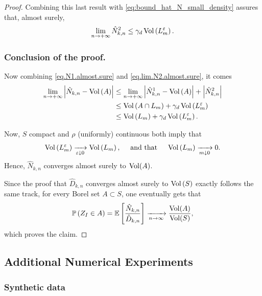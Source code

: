 \documentclass[twoside]{article}
\theoremstyle{definition}
\theoremstyle{remark}
\newcommand{\KVV}{Z} %
\begin{document}
\begin{proof}
Combining this last result with \cref{eq:bound_hat_N_small_density} assures that, almost surely,
\begin{align}\label{eq.lim.N2.almost.sure}
    \lim_{n\to+\infty} \hat{N}_{k,n}^2 \leq \gamma_d \operatorname{Vol}\left(L_m^\varepsilon\right) .
\end{align}   






\subsubsection*{Conclusion of the proof.}

Now combining \cref{eq.N1.almost.sure} and \cref{eq.lim.N2.almost.sure}, it comes
\begin{align*}
\lim_{n\to+\infty}\left|\hat{N}_{k,n} - \operatorname{Vol}\left(A\right)\right| & \leq \lim_{n\to+\infty}\left|\hat{N}_{k,n}^1 - \operatorname{Vol}\left(A\right)\right| + \left|\hat{N}_{k,n}^2\right| \\
&  \leq {\operatorname{Vol}\left(A\cap L_m\right)} + \gamma_d \operatorname{Vol}\left(L_m^\varepsilon\right) \\
& \leq \operatorname{Vol}\left(L_m\right) + \gamma_d \operatorname{Vol}\left(L_m^\varepsilon\right).
\end{align*}

Now, $S$ compact and $\rho$ (uniformly) continuous both imply that 
\[
    \operatorname{Vol}\left(L_m^\varepsilon\right) \xrightarrow[\varepsilon\downarrow 0]{} \operatorname{Vol}\left(L_m\right),\quad \text{ and that } \quad \operatorname{Vol}\left(L_m\right) \xrightarrow[m\downarrow 0]{} 0.
\]
%
Hence, $\hat{N}_{k,n}$ converges almost surely to $\operatorname{Vol}(A)$.

Since the proof that $\hat{D}_{k,n}$ converges almost surely to $\operatorname{Vol}\left(S\right)$ exactly follows the same track, for every Borel set $A\subset S$, one eventually gets that 
%
\[
    \P\pa{\KVV_I\in A} = \E\bra{\frac{\hat{N}_{k,n}}{\hat{D}_{k,n}}} \xra{n\to\infty} \frac{\Vol(A)}{\Vol(S)},
\] 
which proves the claim.
%
\end{proof}

\clearpage
\subsection{Additional Numerical Experiments}
\label{app:numerical_experiments}

\subsubsection{Synthetic data}
\label{app:synthetic_data}
\end{document}
